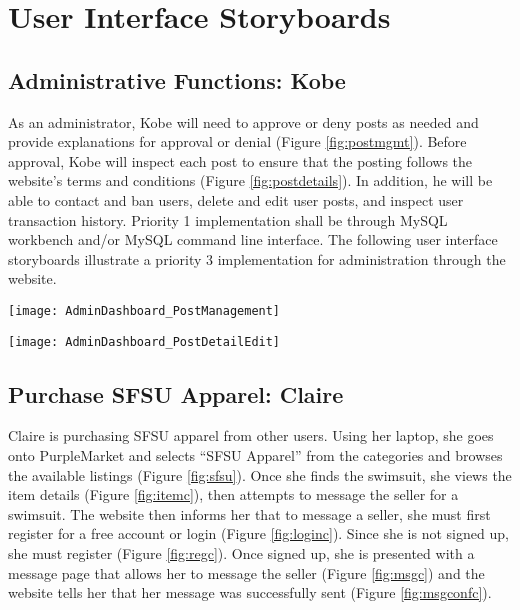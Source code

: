 \section{User Interface Storyboards}

\subsection{Administrative Functions: Kobe}
As an administrator, Kobe will need to approve or deny posts as needed and provide explanations for approval or denial (Figure \ref{fig:postmgmt}).  Before approval, Kobe will inspect each post to ensure that the posting follows the website's terms and conditions (Figure \ref{fig:postdetails}).  In addition, he will be able to contact and ban users, delete and edit user posts, and inspect user transaction history.  Priority 1 implementation shall be through MySQL workbench and/or MySQL command line interface.  The following user interface storyboards illustrate a priority 3 implementation for administration through the website.

\pagebreak
\begin{center}
\label{fig:postmgmt}
\texttt{[image: AdminDashboard\_PostManagement]}
\end{center}

\vspace{10mm}

\begin{center}
\label{fig:postdetails}
\texttt{[image: AdminDashboard\_PostDetailEdit]}
\end{center}

\pagebreak
\subsection{Purchase SFSU Apparel: Claire}
Claire is purchasing SFSU apparel from other users.  Using her laptop, she goes onto PurpleMarket and selects ``SFSU Apparel'' from the categories and browses the available listings (Figure \ref{fig:sfsu}).  Once she finds the swimsuit, she views the item details (Figure \ref{fig:itemc}), then attempts to message the seller for a swimsuit.  The website then informs her that to message a seller, she must first register for a free account or login (Figure \ref{fig:loginc}).  Since she is not signed up, she must register (Figure \ref{fig:regc}).  Once signed up, she is presented with a message page that allows her to message the seller (Figure \ref{fig:msgc}) and the website tells her that her message was successfully sent (Figure \ref{fig:msgconfc}).

